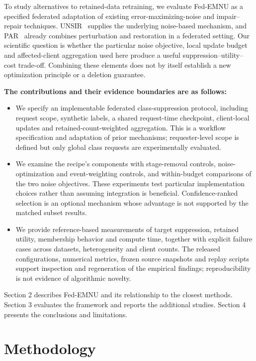 \documentclass[software,article,submit,moreauthors]{Definitions/mdpi}
\begin{document}
To study alternatives to retained-data retraining, we evaluate Fed-EMNU as a
specified federated adaptation of existing error-maximizing-noise and
impair--repair techniques. UNSIR~\cite{ref20} supplies the underlying noise-based
mechanism, and PAR~\cite{ref21} already combines perturbation and restoration
in a federated setting. Our scientific question is whether the particular
noise objective, local update budget and affected-client aggregation used here
produce a useful suppression--utility--cost trade-off. Combining these elements
does not by itself establish a new optimization principle or a deletion guarantee.

\textbf{The contributions and their evidence boundaries are as follows:}
\begin{itemize}
\item We specify an implementable federated class-suppression protocol,
including request scope, synthetic labels, a shared request-time checkpoint,
client-local updates and retained-count-weighted aggregation. This is a
workflow specification and adaptation of prior mechanisms; requester-level
scope is defined but only global class requests are experimentally evaluated.
\item We examine the recipe's components with stage-removal controls,
noise-optimization and event-weighting controls, and within-budget comparisons
of the two noise objectives. These experiments test particular implementation
choices rather than assuming integration is beneficial. Confidence-ranked
selection is an optional mechanism whose advantage is not supported by the
matched subset results.
\item We provide reference-based measurements of target suppression, retained
utility, membership behavior and compute time, together with explicit failure
cases across datasets, heterogeneity and client counts. The released
configurations, numerical metrics, frozen source snapshots and replay scripts
support inspection and regeneration
of the empirical findings; reproducibility is not evidence of algorithmic novelty.
\end{itemize}

Section 2 describes Fed-EMNU and its relationship to the closest methods.
Section 3 evaluates the framework and reports the additional studies. Section 4
presents the conclusions and limitations.

\section{Methodology}
\label{sec:method}
\end{document}
